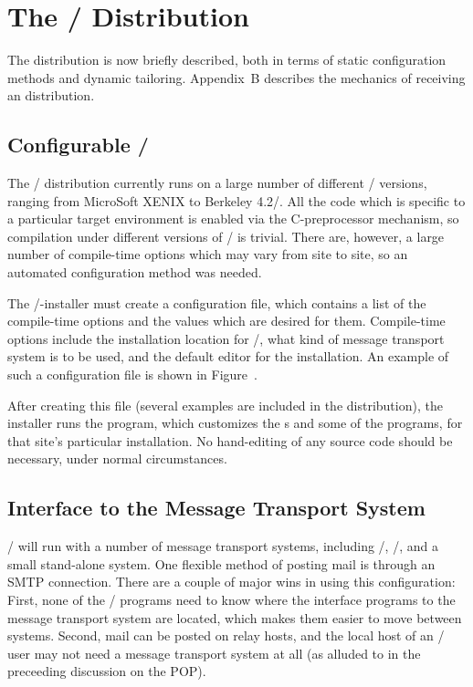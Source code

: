 \section{The \MH/ Distribution}			%
The  distribution is now briefly described,
both in terms of static configuration methods
and dynamic tailoring.
Appendix~B describes the mechanics of receiving an  distribution.

\subsection{Configurable \MH/}			%
The \MH/ distribution currently runs on a large number of different \unix/
versions,
ranging from MicroSoft XENIX to Berkeley 4.2\bsd/.
All the code which is specific to a particular target environment is
enabled via the C-preprocessor  mechanism,
so compilation under different versions of \unix/ is trivial.
There are,
however,
a large number of compile-time options which may vary from site to site,
so an automated configuration method was needed.

The \MH/-installer must create a configuration file,
which contains a list of the compile-time options
and the values which are desired for them.
Compile-time options include the installation location for \MH/,
what kind of message transport system is to be used,
and the default editor for the installation.
An example of such a configuration file is shown in Figure~\mhconfig.

After creating this file (several examples are included in the distribution),
the installer runs the  program,
which customizes the s and some of the programs,
for that site's particular installation.
No hand-editing of any source code should be necessary,
under normal circumstances.

\subsection{Interface to the Message Transport System}	%
\MH/ will run with a number of message transport systems,
including \SendMail/, \MMDFII/, and a small stand-alone system.
One flexible method of posting mail is through an SMTP connection.
There are a couple of major wins in using this configuration: 
First,
none of the \MH/ programs need to know where the interface programs to
the message transport system are located,
which makes them easier to move between systems.
Second,
mail can be posted on relay hosts,
and the local host of an \MH/ user may not need a message transport system at
all (as alluded to in the preceeding discussion on the POP).

